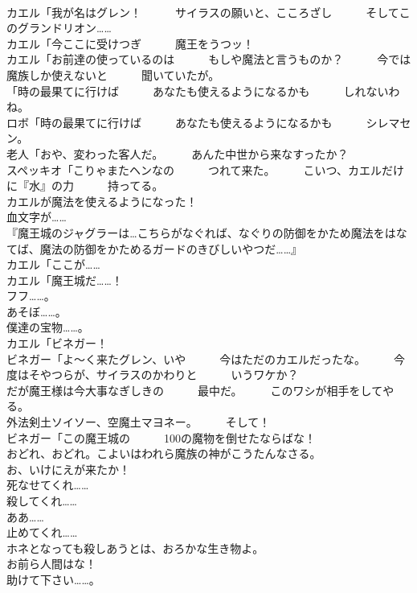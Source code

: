 \documentclass[8pt]{extreport}
\begin{document}
\begin{CJK}{UTF8}{min}
\\	カエル「我が名はグレン！　　　サイラスの願いと、こころざし　　　そしてこのグランドリオン……	
\\	カエル「今ここに受けつぎ　　　魔王をうつッ！	
\\	カエル「お前達の使っているのは　　　もしや魔法と言うものか？　　　今では魔族しか使えないと　　　聞いていたが。	
\\	「時の最果てに行けば　　　あなたも使えるようになるかも　　　しれないわね。	
\\	ロボ「時の最果てに行けば　　　あなたも使えるようになるかも　　　シレマセン。	
\\	老人「おや、変わった客人だ。　　　あんた中世から来なすったか？	
\\	スペッキオ「こりゃまたヘンなの　　　つれて来た。　　　こいつ、カエルだけに『水』の力　　　持ってる。	
\\	カエルが魔法を使えるようになった！	
\\	血文字が……	
\\	『魔王城のジャグラーは…こちらがなぐれば、なぐりの防御をかため魔法をはなてば、魔法の防御をかためるガードのきびしいやつだ……』	
\\	カエル「ここが……	
\\	カエル「魔王城だ……！	
\\	フフ……。	
\\	あそぼ……。	
\\	僕達の宝物……。	
\\	カエル「ビネガー！	
\\	ビネガー「よ～く来たグレン、いや　　　今はただのカエルだったな。　　　今度はそやつらが、サイラスのかわりと　　　いうワケか？	
\\	だが魔王様は今大事なぎしきの　　　最中だ。　　　このワシが相手をしてやる。	
\\	外法剣土ソイソー、空魔土マヨネー。　　　そして！	
\\	ビネガー「この魔王城の　　　100の魔物を倒せたならばな！	
\\	おどれ、おどれ。こよいはわれら魔族の神がこうたんなさる。	
\\	お、いけにえが来たか！	
\\	死なせてくれ……	
\\	殺してくれ……	
\\	ああ……	
\\	止めてくれ……	
\\	ホネとなっても殺しあうとは、おろかな生き物よ。	
\\	お前ら人間はな！	
\\	助けて下さい……。	

\end{CJK}
\end{document}
